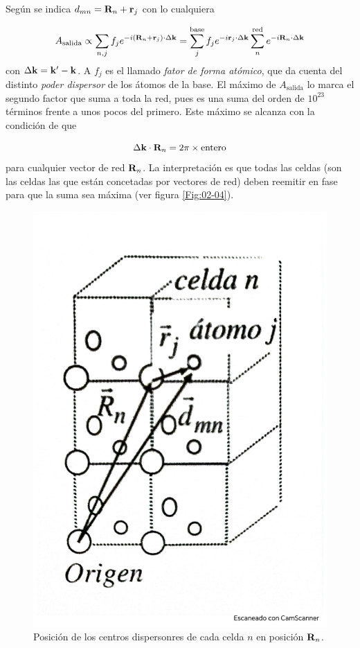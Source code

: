 Según se indica $\mathbf{}d_{mn}=\mathbf{R}_n+\mathbf{r}_j$ con lo cualquiera

\begin{equation}
    A_{\text{salida}} \propto  \sum_{n,j} f_j e^{-i (\mathbf{R}_n + \mathbf{r}_j) \cdot \Delta \mathbf{k}} = \sum_j^{\text{base}} f_j e^{-i \mathbf{r}_j \cdot \Delta \mathbf{k}} \sum_{n}^{\text{red}} e^{-i\mathbf{R}_n \cdot \Delta \mathbf{k}} \label{Ec:02-02-02}
\end{equation}
con $\Delta \mathbf{k} = \mathbf{k}' - \mathbf{k}$. A $f_j$ es el llamado \textit{fator de forma atómico}, que da cuenta del distinto \textit{poder dispersor} de los átomos de la base. El máximo de $A_{\text{salida}}$ lo marca el segundo factor que suma a toda la red, pues es una suma del orden de $10^{23}$ términos frente a unos pocos del primero. Este máximo se alcanza con la condición de que

\begin{equation}
    \Delta \mathbf{k} \cdot \mathbf{R}_n = 2 \pi \times \text{entero} \label{Ec:02-02-03}
\end{equation}
para cualquier vector de red $\mathbf{R}_n$. La interpretación es que todas las celdas (son las celdas las que están concetadas por vectores de red) deben reemitir en fase para que la suma sea máxima (ver figura \ref{Fig:02-04}).
    
\begin{figure}[h!] \centering
    \includegraphics[scale=0.30]{Cuerpo/Ch_02/Fotos_libro 3.pdf}
    \caption{Posición de los centros dispersonres de cada celda $n$ en posición $\mathbf{R}_n$.}
    \label{Fig:02-03}
\end{figure}



